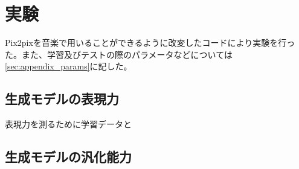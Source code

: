 \section{実験}

Pix2pixを音楽で用いることができるように改変したコードにより実験を行った。また、学習及びテストの際のパラメータなどについては\ref{sec:appendix_params}に記した。

\subsection{生成モデルの表現力}

表現力を測るために学習データと


\subsection{生成モデルの汎化能力}


